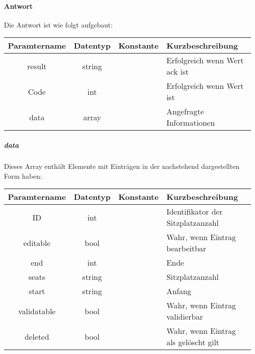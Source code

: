 \paragraph{Antwort}Die Antwort ist wie folgt aufgebaut:
\begin{table}[H]
	\begin{tabular}{|c|c|c|p{6.5cm}|}
		\hline
		\textbf{Paramtername} & \textbf{Datentyp} & \textbf{Konstante} & \textbf{Kurzbeschreibung}                                                                                               \\ \hline
		result              & string           &                 & Erfolgreich wenn Wert {\glqq ack\grqq} ist \\ \hline
		Code                & int              &                 & Erfolgreich wenn Wert {\glqq 0\grqq} ist \\ \hline
		data                & array            &                 & Angefragte Informationen \\ \hline
	\end{tabular}
\end{table}
\subparagraph{data}Dieses Array enthält Elemente mit Einträgen in der nachstehend dargestellten Form haben:
\begin{table}[H]
	\begin{tabular}{|c|c|c|p{6.5cm}|}
		\hline
		\textbf{Paramtername} & \textbf{Datentyp} & \textbf{Konstante} & \textbf{Kurzbeschreibung}    \\ \hline
		ID                     & int             &                 & Identifikator der Sitzplatzanzahl \\ \hline
		editable               & bool            &                 & Wahr, wenn Eintrag bearbeitbar \\ \hline
		end                    & int             &                 & Ende \\ \hline
		seats                  & string          &                 & Sitzplatzanzahl \\ \hline
		start                  & string          &                 & Anfang \\ \hline
		validatable            & bool            &                 & Wahr, wenn Eintrag validierbar \\ \hline
		deleted                & bool            &                 & Wahr, wenn Eintrag als gelöscht gilt \\ \hline
	\end{tabular}
\end{table}

